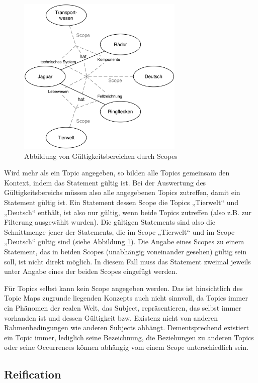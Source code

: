 \begin{figure}[htbp]
	\centering
		\includegraphics[height=3in]{img/Persistenz/Scope.png}
	\caption{Abbildung von Gültigkeitsbereichen durch Scopes}
	\label{fig:img_Persistenz_Scope}
\end{figure}


Wird mehr als ein Topic angegeben, so bilden alle Topics gemeinsam den Kontext, indem das Statement gültig ist. Bei der Auswertung des Gültigkeitsbereichs müssen also alle angegebenen Topics zutreffen, damit ein Statement gültig ist. Ein Statement dessen Scope die Topics „Tierwelt“ und „Deutsch“ enthält, ist also nur gültig, wenn beide Topics zutreffen (also z.B. zur Filterung ausgewählt wurden). Die gültigen Statements sind also die Schnittmenge jener der Statements, die im Scope „Tierwelt“ und im Scope „Deutsch“ gültig sind (siehe Abbildung \ref{fig:img_Persistenz_Scope}). Die Angabe eines Scopes zu einem Statement, das in beiden Scopes (unabhängig voneinander gesehen) gültig sein soll, ist nicht direkt möglich. In diesem Fall muss das Statement zweimal jeweils unter Angabe eines der beiden Scopes eingefügt werden.

Für Topics selbst kann kein Scope angegeben werden. Das ist hinsichtlich des Topic Maps zugrunde liegenden Konzepts auch nicht sinnvoll, da Topics immer ein Phänomen der realen Welt, das Subject, repräsentieren, das selbst immer vorhanden ist und dessen Gültigkeit bzw. Existenz nicht von anderen Rahmenbedingungen wie anderen Subjects abhängt. Dementsprechend existiert ein Topic immer, lediglich seine Bezeichnung, die Beziehungen zu anderen Topics oder seine Occurrences können abhängig vom einem Scope unterschiedlich sein.

\subsection{Reification} %
\label{sub:reification}

